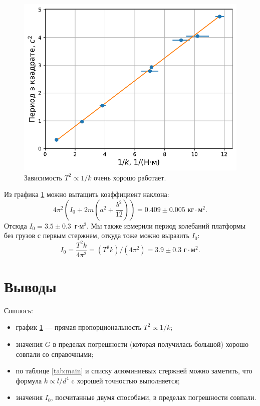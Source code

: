 \documentclass[a4paper, 12pt]{article}
\begin{document}
\begin{figure}[h!]
\caption{Зависимость $T^2 \propto 1/k$ очень хорошо работает.}
\begin{center}
\includegraphics[width=0.8\linewidth]{periods_vs_tors_coefs_plot.pdf}
\end{center}
\label{fig:tk}
\end{figure}

\clearpage
Из графика \ref{fig:tk} можно вытащить коэффициент наклона:
\[
4 \pi^2 \left(I_0 + 2m \left( a^2 + \frac{b^2}{12} \right)\right) = 0.409 \pm 0.005 \text{ кг$\cdot$м$^2$}
.\]
Отсюда $I_0 = 3.5 \pm 0.3$~г$\cdot$м$^2$.
Мы также измерили период колебаний платформы без грузов с первым стержнем, откуда тоже можно выразить $I_0$:
\[ I_0 = \frac{T^2 k}{4 \pi^2} = (T^2 k)/(4 \pi^2) = 3.9 \pm 0.3 \text{ г$\cdot$м$^2$} .\]

\section{Выводы}
Сошлось:
\begin{itemize}
\item график \ref{fig:tk} --- прямая пропорциональность  $T^2 \propto 1/k$;
\item значения $G$ в пределах погрешности (которая получилась большой) хорошо совпали со справочными;
\item по таблице \ref{tab:main} и списку алюминиевых стержней можно заметить, что формула $k \propto l/d^4$ c хорошей точностью выполняется;
\item значения $I_0$, посчитанные двумя способами, в пределах погрешности совпали.
\end{itemize}
\end{document}
